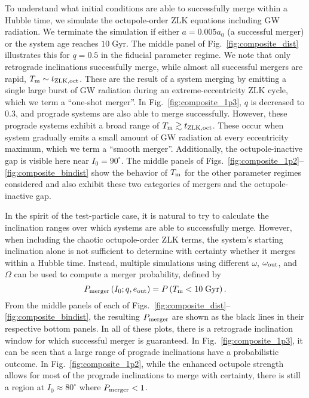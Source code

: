 \documentclass[
        fleqn,
        usenatbib,
    ]{mnras}
\newcommand*{\p}[1]{\left(#1\right)}
\begin{document}
To understand what initial conditions are able to successfully merge within a
Hubble time, we simulate the octupole-order ZLK equations including GW
radiation. We terminate the simulation if either $a = 0.005a_0$ (a successful
merger) or the system age reaches $10\;\mathrm{Gyr}$. The middle panel of
Fig.~\ref{fig:composite_dist} illustrates this for $q = 0.5$ in the fiducial
parameter regime. We note that only retrograde inclinations successfully merge,
while almost all successful mergers are rapid, $T_{\rm
m} \sim t_{\rm ZLK, oct}$. These are the result of a system merging by emitting
a single large burst of GW radiation during an extreme-eccentricity ZLK cycle,
which we term a ``one-shot merger''. In Fig.~\ref{fig:composite_1p3}, $q$ is
decreased to $0.3$, and prograde systems are also able to merge successfully.
However, these prograde systems exhibit a broad range of $T_{\rm m} \gtrsim
t_{\rm ZLK, oct}$. These occur when system gradually emits a small amount of
GW radiation at every eccentricity maximum, which we term a ``smooth merger''.
Additionally, the octupole-inactive gap is visible here near $I_0 = 90^\circ$.
The middle panels of Figs.~\ref{fig:composite_1p2}--\ref{fig:composite_bindist}
show the behavior of $T_{\rm m}$ for the other parameter regimes considered and
also exhibit these two categories of mergers and the octupole-inactive gap.

In the spirit of the test-particle case, it is natural to try to calculate the
inclination ranges over which systems are able to successfully merge. However,
when including the chaotic octupole-order ZLK terms, the system's starting
inclination alone is not sufficient to determine with certainty whether it
merges within a Hubble time. Instead, multiple simulations using different
$\omega$, $\omega_{\rm out}$, and $\Omega$ can be used to compute a merger
probability, defined by
\begin{equation}
    P_{\rm merger}\p{I_0; q, e_{\rm out}} = P\p{T_{\rm m} < 10\;\mathrm{Gyr}}.
        \label{eq:def_pmerge}
\end{equation}
From the middle panels of each of
Figs.~\ref{fig:composite_dist}--\ref{fig:composite_bindist}, the resulting
$P_{\rm merger}$ are shown as the black lines in their respective bottom panels.
In all of these plots, there is a retrograde inclination window for which
successful merger is guaranteed. In Fig.~\ref{fig:composite_1p3}, it can be seen
that a large range of prograde inclinations have a probabilistic outcome. In
Fig.~\ref{fig:composite_1p2}, while the enhanced octupole strength allows for
most of the prograde inclinations to merge with certainty, there is still a
region at $I_0 \approx 80^\circ$ where $P_{\rm merger} < 1$.
\end{document}
